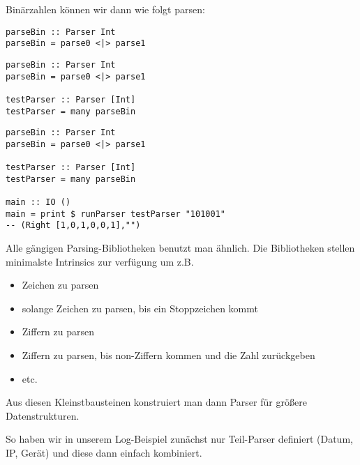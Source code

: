 \documentclass{beamer}
\begin{document}
\begin{frame}[fragile]
Binärzahlen können wir dann wie folgt parsen:\bigskip

\begin{overprint}
\begin{verbatim}
parseBin :: Parser Int
parseBin = parse0 <|> parse1
\end{verbatim}
\begin{verbatim}
parseBin :: Parser Int
parseBin = parse0 <|> parse1

testParser :: Parser [Int]
testParser = many parseBin
\end{verbatim}
\begin{verbatim}
parseBin :: Parser Int
parseBin = parse0 <|> parse1

testParser :: Parser [Int]
testParser = many parseBin

main :: IO ()
main = print $ runParser testParser "101001"
-- (Right [1,0,1,0,0,1],"")
\end{verbatim}
\end{overprint}
\end{frame}

\begin{frame}[fragile]
Alle gängigen Parsing-Bibliotheken benutzt man ähnlich. Die Bibliotheken stellen minimalste Intrinsics zur verfügung um z.B.
\pause
\begin{itemize}
 \item Zeichen zu parsen
 \pause
 \item solange Zeichen zu parsen, bis ein Stoppzeichen kommt
 \pause
 \item Ziffern zu parsen
 \pause
 \item Ziffern zu parsen, bis non-Ziffern kommen und die Zahl zurückgeben
 \pause
 \item etc.
\end{itemize}
\pause
Aus diesen Kleinstbausteinen konstruiert man dann Parser für größere Datenstrukturen.\\\par
\pause
So haben wir in unserem Log-Beispiel zunächst nur Teil-Parser definiert (Datum, IP, Gerät) und diese dann einfach kombiniert.
\end{frame}
\end{document}
